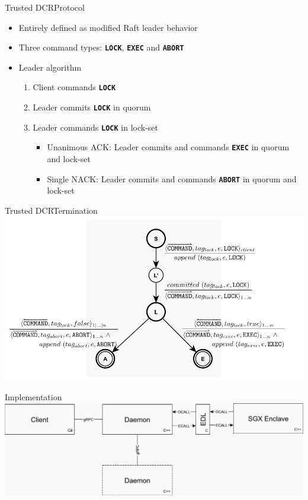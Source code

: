 \documentclass{beamer}
\begin{document}
\begin{frame}{Trusted DCR}{Protocol}%
  \begin{itemize}
    \item Entirely defined as modified Raft leader behavior
    \item Three command types: \textbf{\texttt{LOCK}}, \textbf{\texttt{EXEC}} and \textbf{\texttt{ABORT}}

    \vfill

    \item Leader algorithm
    \begin{enumerate}
      \item Client commands \textbf{\texttt{LOCK}}
      \item Leader commits \textbf{\texttt{LOCK}} in quorum
      \item Leader commands \textbf{\texttt{LOCK}} in lock-set
      \begin{itemize}
        \item Unanimous ACK: Leader commits and commands \textbf{\texttt{EXEC}} in quorum and lock-set
        \item Single NACK: Leader commits and commands \textbf{\texttt{ABORT}} in quorum and lock-set
      \end{itemize}
    \end{enumerate}
  \end{itemize}
\end{frame}

\begin{frame}{Trusted DCR}{Termination}%
  \vfill
  \includegraphics[width=\textwidth]{figures/raft-2pc.pdf}
  \vfill
\end{frame}

\begin{frame}{Implementation}%
  \vfill
  \includegraphics[width=\textwidth]{figures/network-stack.pdf}
  \vfill
\end{frame}
\end{document}
